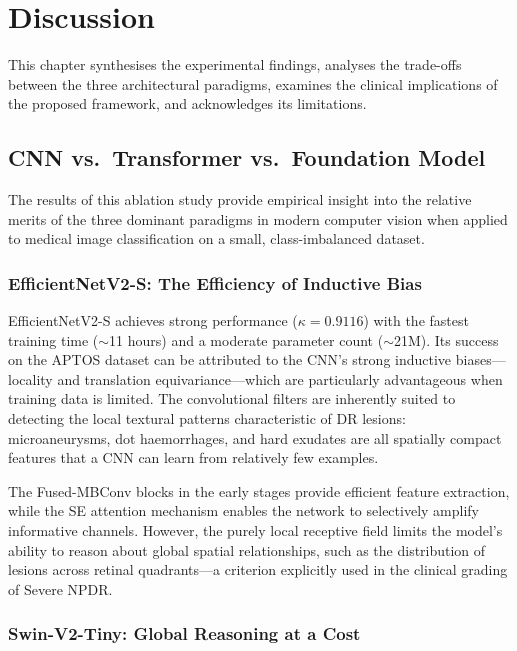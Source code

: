 \chapter{Discussion}
\label{ch:discussion}

This chapter synthesises the experimental findings, analyses the trade-offs between the three architectural paradigms, examines the clinical implications of the proposed framework, and acknowledges its limitations.

\section{CNN vs.\ Transformer vs.\ Foundation Model}
\label{sec:arch_comparison}

The results of this ablation study provide empirical insight into the relative merits of the three dominant paradigms in modern computer vision when applied to medical image classification on a small, class-imbalanced dataset.

\subsection{EfficientNetV2-S: The Efficiency of Inductive Bias}

EfficientNetV2-S achieves strong performance ($\kappa = 0.9116$) with the fastest training time ($\sim$11 hours) and a moderate parameter count ($\sim$21M). Its success on the APTOS dataset can be attributed to the CNN's strong inductive biases---locality and translation equivariance---which are particularly advantageous when training data is limited. The convolutional filters are inherently suited to detecting the local textural patterns characteristic of DR lesions: microaneurysms, dot haemorrhages, and hard exudates are all spatially compact features that a CNN can learn from relatively few examples.

The Fused-MBConv blocks in the early stages provide efficient feature extraction, while the SE attention mechanism enables the network to selectively amplify informative channels. However, the purely local receptive field limits the model's ability to reason about global spatial relationships, such as the distribution of lesions across retinal quadrants---a criterion explicitly used in the clinical grading of Severe NPDR.

\subsection{Swin-V2-Tiny: Global Reasoning at a Cost}

